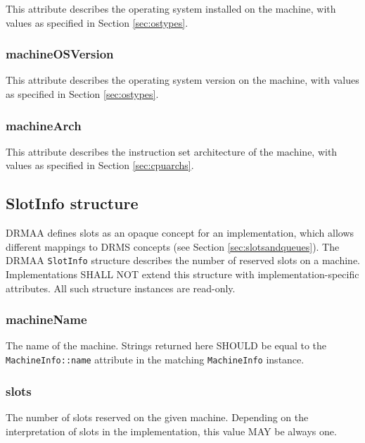 \documentclass{article}
\newcommand{\h}[1]{\lstinline|#1|}
\newcommand{\rat}[1]{}
\begin{document}
This attribute describes the operating system installed on the machine, with values as specified in Section \ref{sec:ostypes}.

\subsubsection{machineOSVersion}

This attribute describes the operating system version on the machine, with values as specified in Section \ref{sec:ostypes}. 

\subsubsection{machineArch}

This attribute describes the instruction set architecture of the machine, with values as specified in Section \ref{sec:cpuarchs}. 

\subsection{SlotInfo structure}
\label{sec:slotinfo}

DRMAA defines slots as an opaque concept for an implementation, which allows different mappings to DRMS concepts (see Section \ref{sec:slotsandqueues}). The DRMAA \h{SlotInfo} structure describes the number of reserved slots on a machine. Implementations SHALL NOT extend this structure with implementation-specific attributes. All such structure instances are read-only.

\rat{
We could see no use case in realizing implementation-specific extensions here, so this structure is not considered in DrmaaReflective. 
}



\subsubsection{machineName}

The name of the machine. Strings returned here SHOULD be equal to the  \h{MachineInfo::name} attribute in the matching \h{MachineInfo} instance.

\subsubsection{slots}

The number of slots reserved on the given machine. Depending on the interpretation of slots in the implementation, this value MAY be always one.
\end{document}
